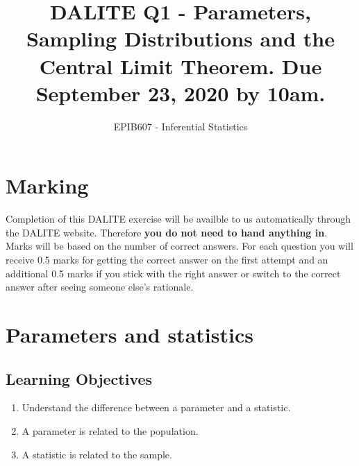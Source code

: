 \documentclass[letterpaper,12pt,twoside,]{pinp}
\title{DALITE Q1 - Parameters, Sampling Distributions and the Central Limit
Theorem. Due September 23, 2020 by 10am.}
\author[a]{EPIB607 - Inferential Statistics}
\affil[a]{Fall 2020, McGill University}
\providecommand{\tightlist}{%
  \setlength{\itemsep}{0pt}\setlength{\parskip}{0pt}}
\begin{document}
\verticaladjustment{-2pt}

\maketitle
\thispagestyle{firststyle}



\hypertarget{marking}{%
\section*{Marking}\label{marking}}

Completion of this DALITE exercise will be availble to us automatically
through the DALITE website. Therefore \textbf{you do not need to hand
anything in}. Marks will be based on the number of correct answers. For
each question you will receive 0.5 marks for getting the correct answer
on the first attempt and an additional 0.5 marks if you stick with the
right answer or switch to the correct answer after seeing someone else's
rationale.

\hypertarget{parameters-and-statistics}{%
\section{Parameters and statistics}\label{parameters-and-statistics}}

\hypertarget{learning-objectives}{%
\subsection{Learning Objectives}\label{learning-objectives}}

\begin{enumerate}
\def\labelenumi{\arabic{enumi}.}
\tightlist
\item
  Understand the difference between a parameter and a statistic.
\item
  A parameter is related to the population.
\item
  A statistic is related to the sample.
\end{enumerate}
\end{document}

